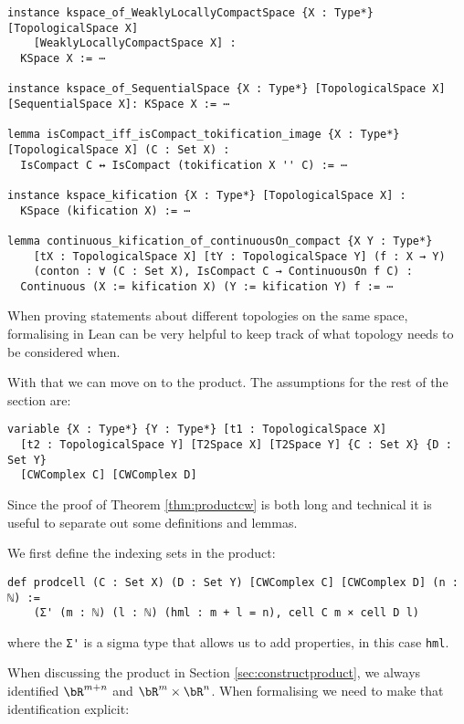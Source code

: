 \begin{lstlisting}
instance kspace_of_WeaklyLocallyCompactSpace {X : Type*}[TopologicalSpace X]
    [WeaklyLocallyCompactSpace X] : 
  KSpace X := ⋯

instance kspace_of_SequentialSpace {X : Type*} [TopologicalSpace X] [SequentialSpace X]: KSpace X := ⋯

lemma isCompact_iff_isCompact_tokification_image {X : Type*} [TopologicalSpace X] (C : Set X) :
  IsCompact C ↔ IsCompact (tokification X '' C) := ⋯

instance kspace_kification {X : Type*} [TopologicalSpace X] : 
  KSpace (kification X) := ⋯

lemma continuous_kification_of_continuousOn_compact {X Y : Type*} 
    [tX : TopologicalSpace X] [tY : TopologicalSpace Y] (f : X → Y) 
    (conton : ∀ (C : Set X), IsCompact C → ContinuousOn f C) :
  Continuous (X := kification X) (Y := kification Y) f := ⋯
\end{lstlisting}

When proving statements about different topologies on the same space, formalising in Lean can be very helpful to keep track of what topology needs to be considered when. 

With that we can move on to the product. 
The assumptions for the rest of the section are:

\begin{lstlisting}
variable {X : Type*} {Y : Type*} [t1 : TopologicalSpace X] 
  [t2 : TopologicalSpace Y] [T2Space X] [T2Space Y] {C : Set X} {D : Set Y} 
  [CWComplex C] [CWComplex D]
\end{lstlisting}

Since the proof of Theorem \ref{thm:productcw} is both long and technical it is useful to separate out some definitions and lemmas. 

We first define the indexing sets in the product:
\href{https://github.com/scholzhannah/CWComplexes/blob/7be4872a05b534011cc969eb5b80a4b7f0bf57e2/CWcomplexes/Product.lean#L29-L31}{\faExternalLink}

\begin{lstlisting}
def prodcell (C : Set X) (D : Set Y) [CWComplex C] [CWComplex D] (n : ℕ) :=
    (Σ' (m : ℕ) (l : ℕ) (hml : m + l = n), cell C m × cell D l)
\end{lstlisting}

where the \lstinline{Σ'} is a sigma type that allows us to add properties, in this case \lstinline{hml}. 

When discussing the product in Section \ref{sec:constructproduct}, we always identified $\bR^{m + n}$ and $\bR^m \times \bR^n$. 
When formalising we need to make that identification explicit: 
\href{https://github.com/scholzhannah/CWComplexes/blob/7be4872a05b534011cc969eb5b80a4b7f0bf57e2/CWcomplexes/Product.lean#L33-L36}{\faExternalLink}

